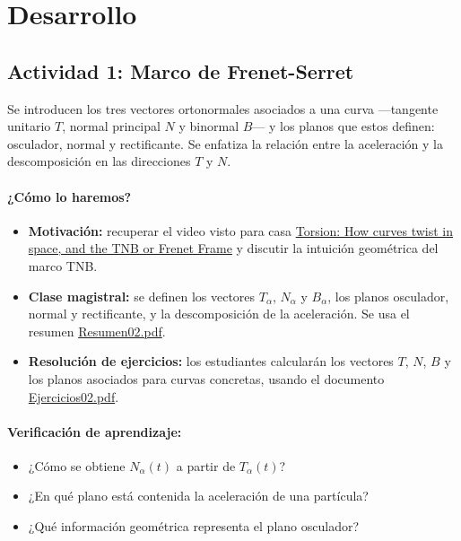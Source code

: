\documentclass[a4,11pt]{aleph-notas}
\begin{document}
\section*{Desarrollo}

\subsection*{Actividad 1: Marco de Frenet-Serret}
Se introducen los tres vectores ortonormales asociados a una curva —tangente unitario $T$, normal principal $N$ y binormal $B$— y los planos que estos definen: osculador, normal y rectificante. Se enfatiza la relación entre la aceleración y la descomposición en las direcciones $T$ y $N$.

\paragraph{¿Cómo lo haremos?}
\begin{itemize}[leftmargin=*]
    \item \textbf{Motivación:} recuperar el video visto para casa \href{https://youtu.be/VIqA8U9ozIA?si=G4a9bhE6ieUn622f}{Torsion: How curves twist in space, and the TNB or Frenet Frame} y discutir la intuición geométrica del marco TNB.
    \item \textbf{Clase magistral:} se definen los vectores $T_\alpha$, $N_\alpha$ y $B_\alpha$, los planos osculador, normal y rectificante, y la descomposición de la aceleración. Se usa el resumen \href{https://andres-merino.github.io/MatematicaIII-05-N0051/01Resumen/Resumen02.pdf}{Resumen02.pdf}.
    \item \textbf{Resolución de ejercicios:} los estudiantes calcularán los vectores $T$, $N$, $B$ y los planos asociados para curvas concretas, usando el documento \href{https://andres-merino.github.io/MatematicaIII-05-N0051/04Ejercicios/Ejercicios02.pdf}{Ejercicios02.pdf}.
\end{itemize}

\paragraph{Verificación de aprendizaje:}
\begin{itemize}[leftmargin=*]
    \item ¿Cómo se obtiene $N_\alpha(t)$ a partir de $T_\alpha(t)$?
    \item ¿En qué plano está contenida la aceleración de una partícula?
    \item ¿Qué información geométrica representa el plano osculador?
\end{itemize}
\end{document}
